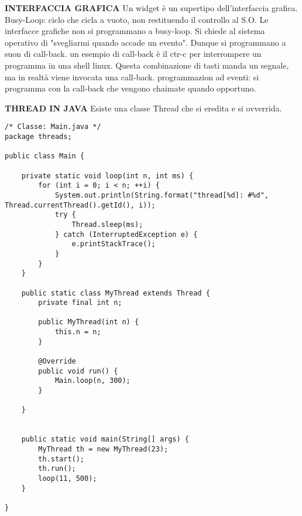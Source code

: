 \noindent \textbf{INTERFACCIA GRAFICA} \newline
Un widget è un supertipo dell'interfaccia grafica. \newline
Busy-Loop: ciclo che cicla a vuoto, non restituendo il controllo al S.O. \newline
Le interfacce grafiche non si programmano a busy-loop. Si chiede al sistema operativo di "svegliarmi quando accade un evento". Dunque si programmano a suon di call-back. \newline
un esempio di call-back è il ctr-c per interrompere un programma in una shell linux. Questa combinazione di tasti manda un segnale, ma in realtà viene invocata una call-back. \newline
programmazion ad eventi: si programma con la call-back che vengono chaimate quando opportuno.

\noindent \textbf{THREAD IN JAVA} \newline
Esiste una classe Thread che si eredita e si ovverrida.



\begin{lstlisting}[basicstyle=\small,]
/* Classe: Main.java */
package threads;

public class Main {

    private static void loop(int n, int ms) {
        for (int i = 0; i < n; ++i) {
            System.out.println(String.format("thread[%d]: #%d", Thread.currentThread().getId(), i));
            try {
                Thread.sleep(ms);
            } catch (InterruptedException e) {
                e.printStackTrace();
            }
        }
    }

    public static class MyThread extends Thread {
        private final int n;

        public MyThread(int n) {
            this.n = n;
        }

        @Override
        public void run() {
            Main.loop(n, 300);
        }

    }


    public static void main(String[] args) {
        MyThread th = new MyThread(23);
        th.start();
        th.run();
        loop(11, 500);
    }

}


\end{lstlisting}

 

 
